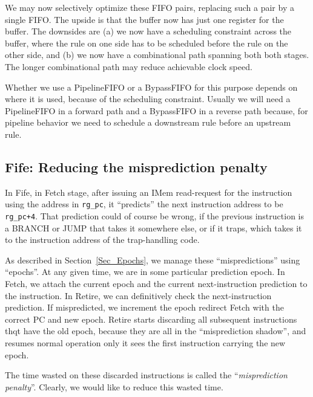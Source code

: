We may now selectively optimize these FIFO pairs, replacing such a
pair by a single FIFO. The upside is that the buffer now has just one
register for the buffer.  The downsides are (a) we now have a
scheduling constraint across the buffer, where the rule on one side
has to be scheduled before the rule on the other side, and (b) we now
have a combinational path spanning both both stages.  The longer
combinational path may reduce achievable clock speed.

Whether we use a PipelineFIFO or a BypassFIFO for this purpose depends
on where it is used, because of the scheduling constraint.  Usually we
will need a PipelineFIFO in a forward path and a BypassFIFO in a
reverse path because, for pipeline behavior we need to schedule a
downstream rule before an upstream rule.


\subsection{Fife: Reducing the misprediction penalty}

\label{Sec_misprediction_penalty}

In Fife, in Fetch stage, after issuing an IMem read-request for the
instruction using the address in \verb|rg_pc|, it ``predicts'' the
next instruction address to be \verb|rg_pc+4|.  That prediction could
of course be wrong, if the previous instruction is a BRANCH or JUMP
that takes it somewhere else, or if it traps, which takes it to the
instruction address of the trap-handling code.

As described in Section~\ref{Sec_Epochs}, we manage these
``mispredictions'' using ``epochs''.  At any given time, we are in
some particular prediction epoch.  In Fetch, we attach the current
epoch and the current next-instruction prediction to the
instruction. In Retire, we can definitively check the next-instruction
prediction.  If mispredicted, we increment the epoch redirect Fetch
with the correct PC and new epoch.  Retire starts discarding all
subsequent instructions thqt have the old epoch, because they are all
in the ``misprediction shadow'', and resumes normal operation only it
sees the first instruction carrying the new epoch.


The time wasted on these discarded instructions is called the
``\emph{misprediction penalty}''.  Clearly, we would like to reduce
this wasted time.

